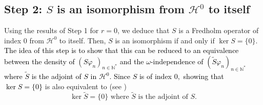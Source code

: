 \documentclass[11pt, dvipsnames]{amsart}
\begin{document}
\subsection{Step 2: $S$ is an isomorphism from $\mathcal{H}^0$ to itself}
\label{sec:step2}

Using the results of Step 1  for $r=0$, we deduce that $S$ is a Fredholm operator of index $0$ from $\mathcal{H}^0$ to itself. Then, $S$ is an isomorphism if and only if $\ker S=\{0\}.$ \textcolor{black}{The idea of this step is to show that this can be reduced to an equivalence between the density of $(S\varphi_{n})_{n\in\mathbb{N}^{*}}$ and the $\omega$-independence of $(\tilde{S}\varphi_{n})_{n\in\mathbb{N}^{*}}$ where $\tilde{S}$ is the adjoint of $S$ in $\mathcal{H}^{0}$.}
\textcolor{black}{Since $S$ is of index $0,$ showing that $\ker S=\{0\}$} is also equivalent to (see \cite[Chapter 4]{Kato-book})
\begin{equation}
\label{eq:equiv}
\ker \tilde S=\{0\}\text{ where }\tilde S\text{ is the adjoint of }S.
\end{equation}
\end{document}
